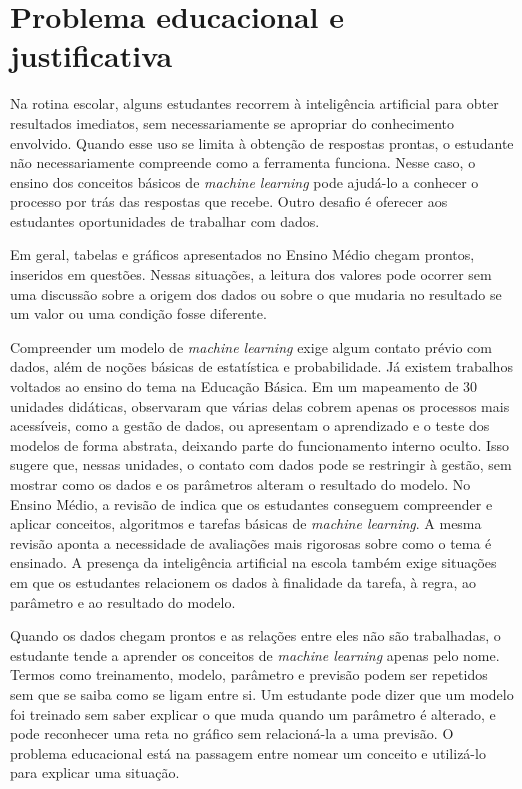 \section{Problema educacional e justificativa}

Na rotina escolar, alguns estudantes recorrem à inteligência artificial para obter resultados imediatos, sem necessariamente se apropriar do conhecimento envolvido. Quando esse uso se limita à obtenção de respostas prontas, o estudante não necessariamente compreende como a ferramenta funciona. Nesse caso, o ensino dos conceitos básicos de \textit{machine learning} pode ajudá-lo a conhecer o processo por trás das respostas que recebe. Outro desafio é oferecer aos estudantes oportunidades de trabalhar com dados.

Em geral, tabelas e gráficos apresentados no Ensino Médio chegam prontos, inseridos em questões. Nessas situações, a leitura dos valores pode ocorrer sem uma discussão sobre a origem dos dados ou sobre o que mudaria no resultado se um valor ou uma condição fosse diferente.

Compreender um modelo de \textit{machine learning} exige algum contato prévio com dados, além de noções básicas de estatística e probabilidade. Já existem trabalhos voltados ao ensino do tema na Educação Básica. Em um mapeamento de 30 unidades didáticas,  observaram que várias delas cobrem apenas os processos mais acessíveis, como a gestão de dados, ou apresentam o aprendizado e o teste dos modelos de forma abstrata, deixando parte do funcionamento interno oculto. Isso sugere que, nessas unidades, o contato com dados pode se restringir à gestão, sem mostrar como os dados e os parâmetros alteram o resultado do modelo. No Ensino Médio, a revisão de  indica que os estudantes conseguem compreender e aplicar conceitos, algoritmos e tarefas básicas de \textit{machine learning}. A mesma revisão aponta a necessidade de avaliações mais rigorosas sobre como o tema é ensinado. A presença da inteligência artificial na escola também exige situações em que os estudantes relacionem os dados à finalidade da tarefa, à regra, ao parâmetro e ao resultado do modelo.

Quando os dados chegam prontos e as relações entre eles não são trabalhadas, o estudante tende a aprender os conceitos de \textit{machine learning} apenas pelo nome. Termos como treinamento, modelo, parâmetro e previsão podem ser repetidos sem que se saiba como se ligam entre si. Um estudante pode dizer que um modelo foi treinado sem saber explicar o que muda quando um parâmetro é alterado, e pode reconhecer uma reta no gráfico sem relacioná-la a uma previsão. O problema educacional está na passagem entre nomear um conceito e utilizá-lo para explicar uma situação.

